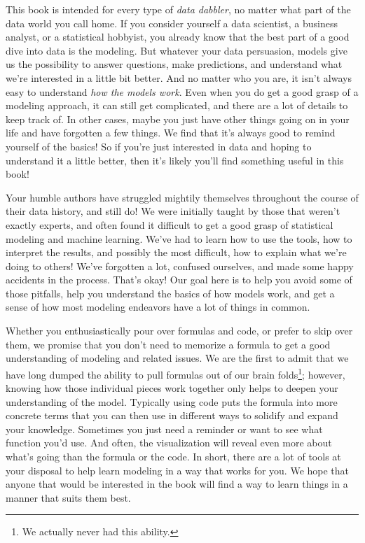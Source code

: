 \documentclass[
  letterpaper,
]{krantz}
\begin{document}
This book is intended for every type of \emph{data dabbler}, no matter
what part of the data world you call home. If you consider yourself a
data scientist, a business analyst, or a statistical hobbyist, you
already know that the best part of a good dive into data is the
modeling. But whatever your data persuasion, models give us the
possibility to answer questions, make predictions, and understand what
we're interested in a little bit better. And no matter who you are, it
isn't always easy to understand \emph{how the models work}. Even when
you do get a good grasp of a modeling approach, it can still get
complicated, and there are a lot of details to keep track of. In other
cases, maybe you just have other things going on in your life and have
forgotten a few things. We find that it's always good to remind yourself
of the basics! So if you're just interested in data and hoping to
understand it a little better, then it's likely you'll find something
useful in this book!

Your humble authors have struggled mightily themselves throughout the
course of their data history, and still do! We were initially taught by
those that weren't exactly experts, and often found it difficult to get
a good grasp of statistical modeling and machine learning. We've had to
learn how to use the tools, how to interpret the results, and possibly
the most difficult, how to explain what we're doing to others! We've
forgotten a lot, confused ourselves, and made some happy accidents in
the process. That's okay! Our goal here is to help you avoid some of
those pitfalls, help you understand the basics of how models work, and
get a sense of how most modeling endeavors have a lot of things in
common.

Whether you enthusiastically pour over formulas and code, or prefer to
skip over them, we promise that you don't need to memorize a formula to
get a good understanding of modeling and related issues. We are the
first to admit that we have long dumped the ability to pull formulas out
of our brain folds\footnote{We actually never had this ability.};
however, knowing how those individual pieces work together only helps to
deepen your understanding of the model. Typically using code puts the
formula into more concrete terms that you can then use in different ways
to solidify and expand your knowledge. Sometimes you just need a
reminder or want to see what function you'd use. And often, the
visualization will reveal even more about what's going than the formula
or the code. In short, there are a lot of tools at your disposal to help
learn modeling in a way that works for you. We hope that anyone that
would be interested in the book will find a way to learn things in a
manner that suits them best.
\end{document}
